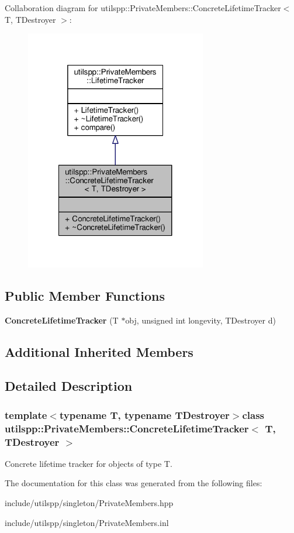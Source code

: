 Collaboration diagram for utilspp\-:\-:Private\-Members\-:\-:Concrete\-Lifetime\-Tracker$<$ T, T\-Destroyer $>$\-:
\nopagebreak
\begin{figure}[H]
\begin{center}
\leavevmode
\includegraphics[width=224pt]{classutilspp_1_1PrivateMembers_1_1ConcreteLifetimeTracker__coll__graph}
\end{center}
\end{figure}
\subsection*{Public Member Functions}
\begin{DoxyCompactItemize}
\item 
\hypertarget{classutilspp_1_1PrivateMembers_1_1ConcreteLifetimeTracker_af560d6aa684c50ae7bfb533fd6ac739c}{{\bfseries Concrete\-Lifetime\-Tracker} (T $\ast$obj, unsigned int longevity, T\-Destroyer d)}\label{classutilspp_1_1PrivateMembers_1_1ConcreteLifetimeTracker_af560d6aa684c50ae7bfb533fd6ac739c}

\end{DoxyCompactItemize}
\subsection*{Additional Inherited Members}


\subsection{Detailed Description}
\subsubsection*{template$<$typename T, typename T\-Destroyer$>$class utilspp\-::\-Private\-Members\-::\-Concrete\-Lifetime\-Tracker$<$ T, T\-Destroyer $>$}

Concrete lifetime tracker for objects of type T. 

The documentation for this class was generated from the following files\-:\begin{DoxyCompactItemize}
\item 
include/utilspp/singleton/Private\-Members.\-hpp\item 
include/utilspp/singleton/Private\-Members.\-inl\end{DoxyCompactItemize}
